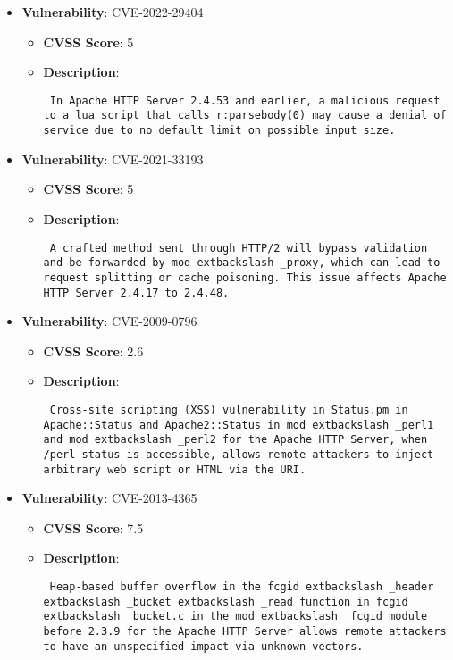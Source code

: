 \documentclass{article}
\begin{document}
\begin{itemize}
        \item \textbf{Vulnerability}: CVE-2022-29404
        \begin{itemize}
            \item \textbf{CVSS Score}:  5 
            \item \textbf{Description}: \parbox{\linewidth}{\texttt{ In Apache HTTP Server 2.4.53 and earlier, a malicious request to a lua script that calls r:parsebody(0) may cause a denial of service due to no default limit on possible input size. }}
        \end{itemize}
    
        \item \textbf{Vulnerability}: CVE-2021-33193
        \begin{itemize}
            \item \textbf{CVSS Score}:  5 
            \item \textbf{Description}: \parbox{\linewidth}{\texttt{ A crafted method sent through HTTP/2 will bypass validation and be forwarded by mod	extbackslash _proxy, which can lead to request splitting or cache poisoning. This issue affects Apache HTTP Server 2.4.17 to 2.4.48. }}
        \end{itemize}
    
        \item \textbf{Vulnerability}: CVE-2009-0796
        \begin{itemize}
            \item \textbf{CVSS Score}:  2.6 
            \item \textbf{Description}: \parbox{\linewidth}{\texttt{ Cross-site scripting (XSS) vulnerability in Status.pm in Apache::Status and Apache2::Status in mod	extbackslash _perl1 and mod	extbackslash _perl2 for the Apache HTTP Server, when /perl-status is accessible, allows remote attackers to inject arbitrary web script or HTML via the URI. }}
        \end{itemize}
    
        \item \textbf{Vulnerability}: CVE-2013-4365
        \begin{itemize}
            \item \textbf{CVSS Score}:  7.5 
            \item \textbf{Description}: \parbox{\linewidth}{\texttt{ Heap-based buffer overflow in the fcgid	extbackslash _header	extbackslash _bucket	extbackslash _read function in fcgid	extbackslash _bucket.c in the mod	extbackslash _fcgid module before 2.3.9 for the Apache HTTP Server allows remote attackers to have an unspecified impact via unknown vectors. }}
        \end{itemize}
    

\end{itemize}
\end{document}
